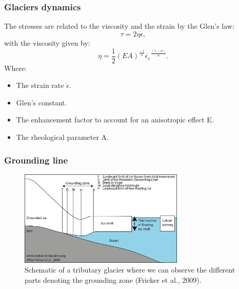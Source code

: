 \documentclass[11pt]{beamer}
\begin{document}
\begin{frame}
	\frametitle{Glaciers dynamics}
	The stresses are related to the viscosity and the strain by the Glen's law:
	\begin{equation}
		\tau = 2\eta\dot{\epsilon},
	\end{equation}
	with the viscosity given by:
	\begin{equation}
		\eta = \frac{1}{2}(EA)^\frac{-1}{n} \dot{\epsilon_e}^\frac{(1-n)}{n}.
	\end{equation}
	Where:
	\begin{itemize}
		\item The strain rate $\dot{\epsilon}$.
		\item Glen's constant.
		\item The enhancement factor to account for an anisotropic effect E.
		\item The rheological parameter A.
	\end{itemize}
\end{frame}
\begin{frame}
	\frametitle{Grounding line}
		\begin{center}
		\begin{figure}[!h]
			\includegraphics[width=0.7\textwidth]{../fig/groundingzone.png} %
			\caption{\footnotesize Schematic of a tributary glacier where we can observe the different parts denoting the grounding zone (Fricker et al., 2009).}
		\end{figure}
	\end{center}
\end{frame}
\end{document}
